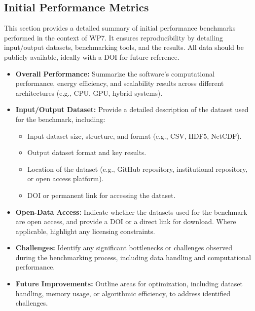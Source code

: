 \subsection{Initial Performance Metrics}
\label{sec:WP7:Feel++:metrics}

This section provides a detailed summary of initial performance benchmarks performed in the context of WP7. It ensures reproducibility by detailing input/output datasets, benchmarking tools, and the results. All data should be publicly available, ideally with a DOI for future reference.

\begin{itemize}
    \item \textbf{Overall Performance:} Summarize the software’s computational performance, energy efficiency, and scalability results across different architectures (e.g., CPU, GPU, hybrid systems).
    \item \textbf{Input/Output Dataset:} Provide a detailed description of the dataset used for the benchmark, including:
        \begin{itemize}
            \item Input dataset size, structure, and format (e.g., CSV, HDF5, NetCDF).
            \item Output dataset format and key results.
            \item Location of the dataset (e.g., GitHub repository, institutional repository, or open access platform).
            \item DOI or permanent link for accessing the dataset.
        \end{itemize}
    \item \textbf{Open-Data Access:} Indicate whether the datasets used for the benchmark are open access, and provide a DOI or a direct link for download. Where applicable, highlight any licensing constraints.
    \item \textbf{Challenges:} Identify any significant bottlenecks or challenges observed during the benchmarking process, including data handling and computational performance.
    \item \textbf{Future Improvements:} Outline areas for optimization, including dataset handling, memory usage, or algorithmic efficiency, to address identified challenges.
\end{itemize}

